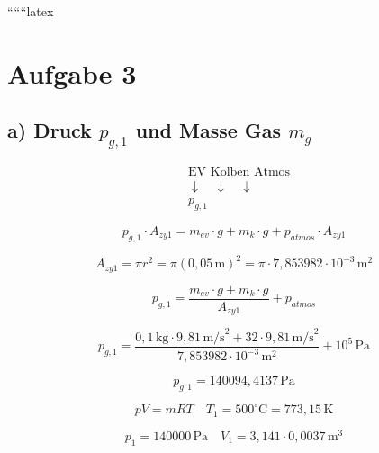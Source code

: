
``````latex


\section*{Aufgabe 3}

\subsection*{a) Druck $p_{g,1}$ und Masse Gas $m_g$}

\begin{equation*}
\begin{aligned}
    &\text{EV Kolben Atmos} \\
    &\downarrow \quad \downarrow \quad \downarrow \\
    &p_{g,1}
\end{aligned}
\end{equation*}

\begin{equation*}
    p_{g,1} \cdot A_{zy1} = m_{ev} \cdot g + m_{k} \cdot g + p_{atmos} \cdot A_{zy1}
\end{equation*}

\begin{equation*}
    A_{zy1} = \pi r^2 = \pi (0,05 \, \text{m})^2 = \pi \cdot 7,853982 \cdot 10^{-3} \, \text{m}^2
\end{equation*}

\begin{equation*}
    p_{g,1} = \frac{m_{ev} \cdot g + m_k \cdot g}{A_{zy1}} + p_{atmos}
\end{equation*}

\begin{equation*}
    p_{g,1} = \frac{0,1 \, \text{kg} \cdot 9,81 \, \text{m/s}^2 + 32 \cdot 9,81 \, \text{m/s}^2}{7,853982 \cdot 10^{-3} \, \text{m}^2} + 10^5 \, \text{Pa}
\end{equation*}

\begin{equation*}
    p_{g,1} = 140094,4137 \, \text{Pa}
\end{equation*}

\begin{equation*}
    pV = mRT \quad T_1 = 500^\circ \text{C} = 773,15 \, \text{K}
\end{equation*}

\begin{equation*}
    p_1 = 140000 \, \text{Pa} \quad V_1 = 3,141 \cdot 0,0037 \, \text{m}^3
\end{equation*}

